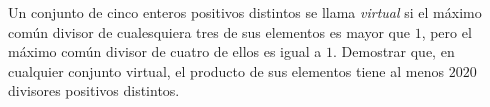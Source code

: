 Un conjunto de cinco enteros positivos distintos se llama \textit{virtual} si el máximo común divisor de cualesquiera tres de sus elementos es mayor que $1$, pero el máximo común divisor de cuatro de ellos es igual a $1$. Demostrar que, en cualquier conjunto virtual, el producto de sus elementos tiene al menos $2020$ divisores positivos distintos.
